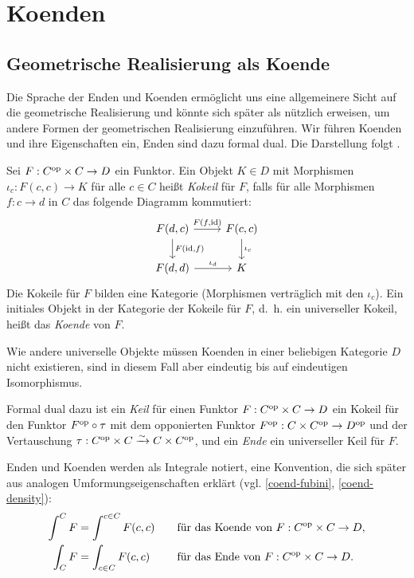 \chapter{Koenden}
\label{ch:coends}

\section{Geometrische Realisierung als Koende}

Die Sprache der Enden und Koenden ermöglicht uns eine allgemeinere
Sicht auf die geometrische Realisierung und könnte sich später als
nützlich erweisen, um andere Formen der geometrischen Realisierung
einzuführen. Wir führen Koenden und ihre Eigenschaften ein, Enden sind
dazu formal dual. Die Darstellung folgt \cite{Lore}.
\begin{defn}
  Sei $F: C^\mathrm{op} \times C \to D$ ein Funktor. Ein Objekt $K \in D$ mit
  Morphismen $\iota_c: F(c, c) \to K$ für alle $c \in C$ heißt
  \emph{Kokeil} für $F$, falls für alle Morphismen $f: c \to d$ in $C$
  das folgende Diagramm kommutiert:
  \[ \begin{tikzcd}
    F(d, c) \arrow{r}{F(f, \id)} \arrow{d}{F(\id, f)}
    & F(c, c) \arrow{d}{\iota_c} \\
    F(d, d) \arrow{r}{\iota_d} & K
  \end{tikzcd} \]
  Die Kokeile für $F$ bilden eine Kategorie (Morphismen verträglich
  mit den $\iota_c$). Ein initiales Objekt in der Kategorie der
  Kokeile für $F$, d.~h. ein universeller Kokeil, heißt das
  \emph{Koende} von $F$.
\end{defn}
Wie andere universelle Objekte müssen Koenden in einer beliebigen
Kategorie $D$ nicht existieren, sind in diesem Fall aber eindeutig bis
auf eindeutigen Isomorphismus.

Formal dual dazu ist ein \emph{Keil} für einen Funktor $F: C^\mathrm{op} \times
C \to D$ ein Kokeil für den Funktor $F^\mathrm{op} \circ \tau$ mit dem
opponierten Funktor $F^\mathrm{op}: C \times C^\mathrm{op} \to D^\mathrm{op}$ und der
Vertauschung $\tau: C^\mathrm{op} \times C \xrightarrow[]{\sim} C \times C^\mathrm{op}$, und ein
\emph{Ende} ein universeller Keil für $F$.

Enden und Koenden werden als Integrale notiert, eine Konvention, die
sich später aus analogen Umformungseigenschaften erklärt
(vgl. \ref{coend-fubini}, \ref{coend-density}):
\begin{alignat*}{2}
  \int^C F &= \int^{c \in C} F(c, c)
  \quad &&\text{für das Koende von } F: C^\mathrm{op} \times C \to D, \\
  \int_C F &= \int_{c \in C} F(c, c)
  && \text{für das Ende von } F: C^\mathrm{op} \times C \to D.
\end{alignat*}

